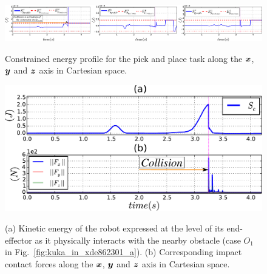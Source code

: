 \documentclass[letterpaper, 10 pt, conference]{ieeeconf}      %
\newcommand{\vect}[1]{\mbox{\boldmath${#1}$}}%
\begin{document}
\begin{figure}
\centering
{\includegraphics[width=2\columnwidth]{figures/ep_profil_xyz_futur_with_recnstruted6}}
\caption{Constrained energy profile for the pick and place task along the $\vect{x}$, $\vect{y}$ and $\vect{z}$ axis in Cartesian space.} 
\label{fig:ep_profil_xyz_futur_with_recnstruted6}
\end{figure}
\begin{figure}[!htbp]
\centering
{\includegraphics[width=0.99\columnwidth]{figures/ec__f_tau65_grand_!!!!}}
\caption{(a) Kinetic energy of the robot expressed at the level of its end-effector as it physically interacts with the nearby obstacle (case $O_1$ in Fig.~\ref{fig:kuka_in_xde862301_a}). (b) Corresponding impact contact forces along the $\vect{x}$, $\vect{y}$ and $\vect{z}$ axis in Cartesian space.} 
\label{fig:ec__f_tau65_grand_!!!!}
\end{figure}
%
\end{document}
